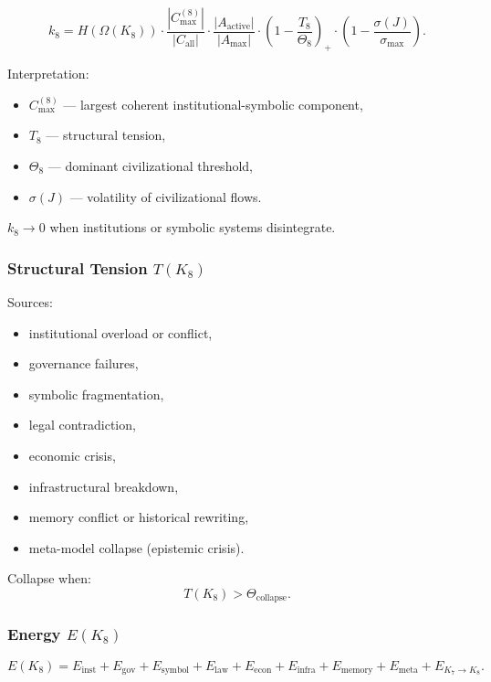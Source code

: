 \[
k_8 =
H(\Omega(K_8))
\cdot
\frac{|C_{\max}^{(8)}|}{|C_{\mathrm{all}}|}
\cdot
\frac{|A_{\mathrm{active}}|}{|A_{\max}|}
\cdot
\left(1-\frac{T_8}{\Theta_8}\right)_+
\cdot
\left(1-\frac{\sigma(J)}{\sigma_{\max}}\right).
\]

Interpretation:
\begin{itemize}
    \item $C_{\max}^{(8)}$ — largest coherent institutional-symbolic component,
    \item $T_8$ — structural tension,
    \item $\Theta_8$ — dominant civilizational threshold,
    \item $\sigma(J)$ — volatility of civilizational flows.
\end{itemize}

$k_8 \to 0$ when institutions or symbolic systems disintegrate.

\subsubsection{Structural Tension \texorpdfstring{$T(K_8)$}{T(K_8)}}

Sources:
\begin{itemize}
    \item institutional overload or conflict,
    \item governance failures,
    \item symbolic fragmentation,
    \item legal contradiction,
    \item economic crisis,
    \item infrastructural breakdown,
    \item memory conflict or historical rewriting,
    \item meta-model collapse (epistemic crisis).
\end{itemize}

Collapse when:
\[
T(K_8) > \Theta_{\mathrm{collapse}}.
\]

\subsubsection{Energy \texorpdfstring{$E(K_8)$}{E(K_8)}}

\[
E(K_8)=
E_{\mathrm{inst}}+
E_{\mathrm{gov}}+
E_{\mathrm{symbol}}+
E_{\mathrm{law}}+
E_{\mathrm{econ}}+
E_{\mathrm{infra}}+
E_{\mathrm{memory}}+
E_{\mathrm{meta}}+
E_{K_7\to K_8}.
\]

